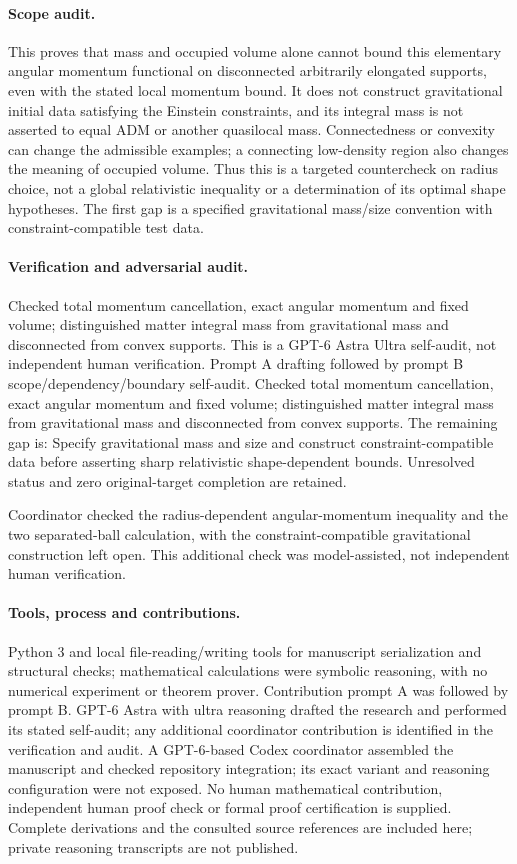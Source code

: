 \documentclass[11pt]{article}
\begin{document}
\paragraph{Scope audit.} This proves that mass and occupied volume alone cannot bound this elementary angular momentum functional on disconnected arbitrarily elongated supports, even with the stated local momentum bound. It does not construct gravitational initial data satisfying the Einstein constraints, and its integral mass is not asserted to equal ADM or another quasilocal mass. Connectedness or convexity can change the admissible examples; a connecting low-density region also changes the meaning of occupied volume. Thus this is a targeted countercheck on radius choice, not a global relativistic inequality or a determination of its optimal shape hypotheses. The first gap is a specified gravitational mass/size convention with constraint-compatible test data.

\paragraph{Verification and adversarial audit.}
Checked total momentum cancellation, exact angular momentum and fixed volume; distinguished matter integral mass from gravitational mass and disconnected from convex supports. This is a GPT-6 Astra Ultra self-audit, not independent human verification. Prompt A drafting followed by prompt B scope/dependency/boundary self-audit. Checked total momentum cancellation, exact angular momentum and fixed volume; distinguished matter integral mass from gravitational mass and disconnected from convex supports. The remaining gap is: Specify gravitational mass and size and construct constraint-compatible data before asserting sharp relativistic shape-dependent bounds. Unresolved status and zero original-target completion are retained.

Coordinator checked the radius-dependent angular-momentum inequality and the two separated-ball calculation, with the constraint-compatible gravitational construction left open. This additional check was model-assisted, not independent human verification.

\paragraph{Tools, process and contributions.}
Python 3 and local file-reading/writing tools for manuscript serialization and structural checks; mathematical calculations were symbolic reasoning, with no numerical experiment or theorem prover. Contribution prompt A was followed by prompt B. GPT-6 Astra with ultra reasoning drafted the research and performed its stated self-audit; any additional coordinator contribution is identified in the verification and audit. A GPT-6-based Codex coordinator assembled the manuscript and checked repository integration; its exact variant and reasoning configuration were not exposed. No human mathematical contribution, independent human proof check or formal proof certification is supplied. Complete derivations and the consulted source references are included here; private reasoning transcripts are not published.
\end{document}
